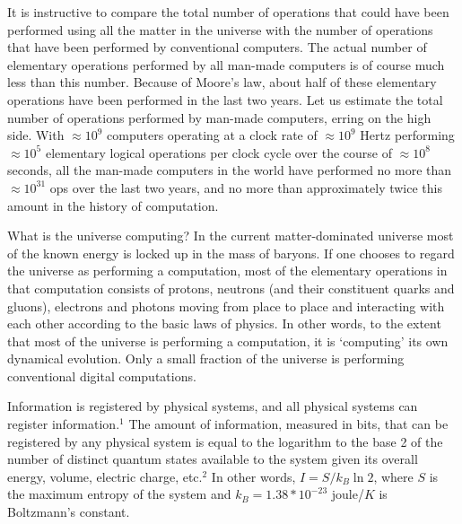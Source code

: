 It is instructive to compare the total number of operations that
could have been performed using all the matter in the universe with
the number of operations that have been performed by conventional computers.
The actual number of elementary operations performed by all man-made
computers is of course much less than this number.  Because of
Moore's law, about half of these elementary operations have been
performed in the last two years.  Let us estimate the total
number of operations performed by man-made computers, erring
on the high side.  With $\approx 10^9$ computers
operating at a clock rate of $\approx 10^9$ Hertz performing
$\approx 10^5$ elementary logical operations per clock cycle over
the course of $\approx 10^{8}$ seconds, all the man-made computers 
in the world have performed no more than
$\approx 10^{31}$ ops over the last two years, and no more than approximately
twice this amount in the history of computation.  

What is the universe computing?
In the current matter-dominated universe most of the known energy is locked
up in the mass of baryons.  If one chooses to regard the universe
as performing a computation, most of the elementary operations in
that computation consists of protons, neutrons (and their constituent 
quarks and gluons), electrons and photons moving from place to place 
and interacting with each other according to the basic laws of physics.
In other words, to the extent that most of the universe is performing
a computation, it is `computing' its own dynamical evolution.  Only a small 
fraction of the universe is performing conventional digital computations.

\bigskip{}

Information is registered by physical systems, and all physical
systems can register information.$^1$  The amount of information,
measured in bits,
that can be registered by any physical system is equal to the 
logarithm to the base 2 of the number of distinct quantum states
available to the system given its overall energy, volume, electric
charge, etc.$^2$  In other words, $I = S/k_B \ln 2$, where $S$ is the
maximum entropy of the system and $k_B = 1.38 * 10^{-23}$ joule/$K$
is Boltzmann's constant.

